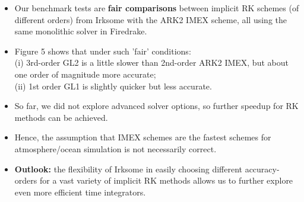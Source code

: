 \documentclass[a4paper]{article}
\newcommand{\checkit}[1]{{\color{red}#1}}
\begin{document}
   \begin{itemize}
    \item Our benchmark tests are \textbf{fair comparisons} between implicit RK schemes (of different orders) from Irksome with the ARK2 IMEX scheme, all using the same monolithic solver in Firedrake.

   \item Figure 5 shows that under such 'fair' conditions:\\
   (i) 3rd-order GL2 is a little slower than 2nd-order ARK2 IMEX, but about one order of magnitude more accurate; \\
   (ii) 1st order GL1 is slightly quicker but less accurate.

  \item So far, we did not explore advanced solver options, so further speedup for RK methods can be achieved.


   \item Hence, the assumption that IMEX schemes are the fastest schemes for atmosphere/ocean simulation is not necessarily correct.

   \item \textbf{Outlook:} the flexibility of Irksome in easily choosing different accuracy-orders for a vast variety of implicit RK methods allows us to further explore even more efficient time integrators.
   \end{itemize}






\end{document}
